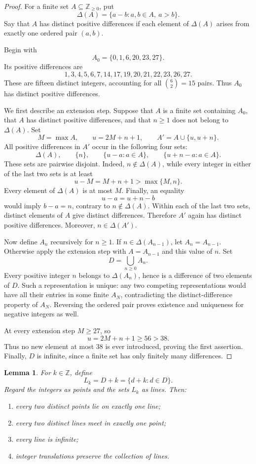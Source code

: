 \documentclass[11pt]{article}
\newcommand{\ZZ}{\mathbb{Z}}
\newtheorem{lemma}[theorem]{Lemma}
\begin{document}
\begin{proof}
For a finite set \(A\subseteq\ZZ_{\geq 0}\), put
\[
    \Delta(A)=\{a-b:a,b\in A,\ a>b\}.
\]
Say that \(A\) has distinct positive differences if each element of
\(\Delta(A)\) arises from exactly one ordered pair \((a,b)\).

Begin with
\[
    A_0=\{0,1,6,20,23,27\}.
\]
Its positive differences are
\[
    1,3,4,5,6,7,14,17,19,20,21,22,23,26,27.
\]
These are fifteen distinct integers, accounting for all
\(\binom{6}{2}=15\) pairs. Thus \(A_0\) has distinct positive differences.

We first describe an extension step. Suppose that \(A\) is a finite set
containing \(A_0\), that \(A\) has distinct positive differences, and that
\(n\geq 1\) does not belong to \(\Delta(A)\). Set
\[
    M=\max A,\qquad u=2M+n+1,
    \qquad A'=A\cup\{u,u+n\}.
\]
All positive differences in \(A'\) occur in the following four sets:
\[
    \Delta(A),\qquad
    \{n\},\qquad
    \{u-a:a\in A\},\qquad
    \{u+n-a:a\in A\}.
\]
These sets are pairwise disjoint. Indeed, \(n\notin\Delta(A)\), while every
integer in either of the last two sets is at least
\[
    u-M=M+n+1>\max\{M,n\}.
\]
Every element of \(\Delta(A)\) is at most \(M\). Finally, an equality
\[
    u-a=u+n-b
\]
would imply \(b-a=n\), contrary to \(n\notin\Delta(A)\).
Within each of the last two sets, distinct elements of \(A\) give distinct
differences. Therefore \(A'\) again has distinct positive differences.
Moreover, \(n\in\Delta(A')\).

Now define \(A_n\) recursively for \(n\geq 1\). If
\(n\in\Delta(A_{n-1})\), let \(A_n=A_{n-1}\). Otherwise apply the extension
step with \(A=A_{n-1}\) and this value of \(n\). Set
\[
    D=\bigcup_{n\geq 0}A_n.
\]
Every positive integer \(n\) belongs to \(\Delta(A_n)\), hence is a
difference of two elements of \(D\). Such a representation is unique:
any two competing representations would have all their entries in some
finite \(A_N\), contradicting the distinct-difference property of \(A_N\).
Reversing the ordered pair proves existence and uniqueness for negative
integers as well.

At every extension step \(M\geq 27\), so
\[
    u=2M+n+1\geq 56>38.
\]
Thus no new element at most \(38\) is ever introduced, proving the first
assertion. Finally, \(D\) is infinite, since a finite set has only finitely
many differences.
\end{proof}

\begin{lemma}\label{lem:incidence}
For \(k\in\ZZ\), define
\[
    L_k=D+k=\{d+k:d\in D\}.
\]
Regard the integers as points and the sets \(L_k\) as lines. Then:
\begin{enumerate}
    \item every two distinct points lie on exactly one line;
    \item every two distinct lines meet in exactly one point;
    \item every line is infinite;
    \item integer translations preserve the collection of lines.
\end{enumerate}
\end{lemma}
\end{document}
